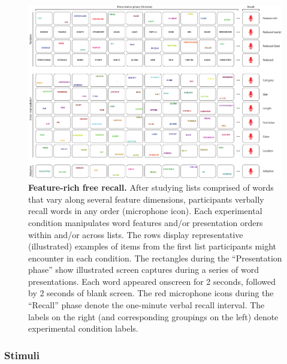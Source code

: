 \documentclass[11pt]{article}
\begin{document}
\begin{figure}[tp]
    \centering
        \includegraphics[width=\textwidth]{figures/FRFR}

\caption{\textbf{Feature-rich free recall.} After studying lists comprised of
words that vary along several feature dimensions, participants verbally recall
words in any order (microphone icon). Each experimental condition manipulates
word features and/or presentation orders within and/or across lists. The rows
display representative (illustrated) examples of items from the first list
participants might encounter in each condition. The rectangles during the
``Presentation phase'' show illustrated screen captures during a series of word
presentations. Each word appeared onscreen for 2 seconds, followed by 2 seconds
of blank screen. The red microphone icons during the ``Recall'' phase denote
the one-minute verbal recall interval. The labels on the right (and
corresponding groupings on the left) denote experimental condition labels.}

    \label{fig:exp}
\end{figure}



\subsubsection*{Stimuli}
\end{document}
